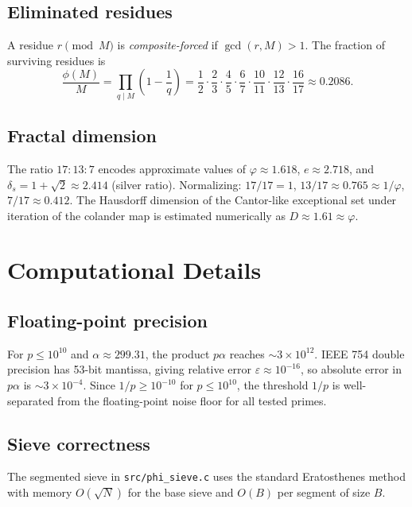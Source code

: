 \documentclass[12pt]{amsart}
\theoremstyle{definition}
\begin{document}
\subsection{Eliminated residues}

A residue $r \pmod{M}$ is \emph{composite-forced} if $\gcd(r, M) > 1$.
The fraction of surviving residues is
\[
  \frac{\phi(M)}{M} = \prod_{q \mid M}\!\left(1 - \frac{1}{q}\right)
  = \frac{1}{2}\cdot\frac{2}{3}\cdot\frac{4}{5}\cdot\frac{6}{7}\cdot\frac{10}{11}
    \cdot\frac{12}{13}\cdot\frac{16}{17}
  \approx 0.2086.
\]

\subsection{Fractal dimension}

The ratio $17:13:7$ encodes approximate values of $\varphi \approx 1.618$,
$e \approx 2.718$, and $\delta_s = 1 + \sqrt{2} \approx 2.414$ (silver ratio).
Normalizing: $17/17 = 1$, $13/17 \approx 0.765 \approx 1/\varphi$,
$7/17 \approx 0.412$.
The Hausdorff dimension of the Cantor-like exceptional set under iteration of
the colander map is estimated numerically as $D \approx 1.61 \approx \varphi$.

\section{Computational Details}

\subsection{Floating-point precision}

For $p \leq 10^{10}$ and $\alpha \approx 299.31$, the product $p\alpha$ reaches
$\sim 3 \times 10^{12}$.  IEEE 754 double precision has 53-bit mantissa, giving
relative error $\varepsilon \approx 10^{-16}$, so absolute error in $p\alpha$ is
$\sim 3 \times 10^{-4}$.  Since $1/p \geq 10^{-10}$ for $p \leq 10^{10}$, the
threshold $1/p$ is well-separated from the floating-point noise floor for all
tested primes.

\subsection{Sieve correctness}

The segmented sieve in \texttt{src/phi\_sieve.c} uses the standard
Eratosthenes method with memory $O(\sqrt{N})$ for the base sieve and
$O(B)$ per segment of size $B$.
\end{document}
